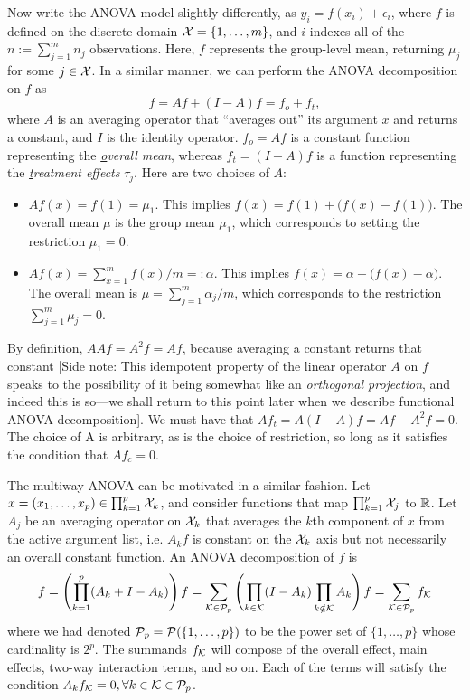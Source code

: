 
Now write the ANOVA model slightly differently, as $y_{i} = f(x_i) + \epsilon_{i}$, where $f$ is defined on the discrete domain ${\mathcal X} = \{1,\dots,m\}$, and $i$ indexes all of the $n := \sum_{j=1}^m n_j$ observations.
Here, $f$ represents the group-level mean, returning $\mu_j$ for some $j\in{\mathcal X}$.
In a similar manner, we can perform the ANOVA decomposition on $f$ as
\[
  f = Af + (I-A)f = f_o + f_t,
\]
where $A$ is an averaging operator that ``averages out'' its argument $x$ and returns a constant, and $I$ is the identity operator.
$f_o = Af$ is a constant function representing the \textit{\underline{o}verall mean}, whereas $f_t = (I - A)f$ is a function representing the \textit{\underline{t}reatment effects} $\tau_j$.
Here are two choices of $A$:
\begin{itemize}
  \item $Af(x) = f(1) = \mu_1$. This implies $f(x) = f(1) + \big(f(x) - f(1)\big)$. The overall mean $\mu$ is the group mean $\mu_1$, which corresponds to setting the restriction $\mu_1=0$.
  \item $Af(x) = \sum_{x=1}^m f(x) / m =: \bar \alpha$. This implies $f(x) = \bar \alpha + \big( f(x) - \bar \alpha \big)$. The overall mean is $\mu = \sum_{j=1}^m \alpha_j/m$, which corresponds to the restriction $\sum_{j=1}^m \mu_j = 0$.
\end{itemize}
By definition, $AAf = A^2f = Af$, because averaging a constant returns that constant
[Side note: This idempotent property of the linear operator $A$ on $f$ speaks to the possibility of it being somewhat like an \emph{orthogonal projection}, and indeed this is so---we shall return to this point later when we describe functional ANOVA decomposition].
We must have that $Af_t = A(I - A)f = Af - A^2f = 0$.
The choice of A is arbitrary, as is the choice of restriction, so long as it satisfies the condition that $Af_c = 0$.

The multiway ANOVA can be motivated in a similar fashion. 
Let $x = (x_1,\dots,x_p) \in \prod_{k=1}^p {\mathcal X}_k$, and consider functions that map $\prod_{k=1}^p {\mathcal X}_j$ to $\mathbb{R}$.
Let $A_j$ be an averaging operator on ${\mathcal X}_k$ that averages the $k$th component of $x$ from the active argument list, i.e. $A_kf$ is constant on the ${\mathcal X}_k$ axis but not necessarily an overall constant function.
An ANOVA decomposition of $f$ is
\[
  f = \left( \prod_{k=1}^p (A_k + I - A_k) \right)f = \sum_{{\mathcal K}\in{\mathcal P}_p} \left( \prod_{k\in{\mathcal K}} (I - A_k) \prod_{k\notin{\mathcal K}} A_k \right)f = \sum_{{\mathcal K}\in{\mathcal P}_p} f_{\mathcal K}
\]
where we had denoted ${\mathcal P}_p = {\mathcal P}(\{1,\dots,p\})$ to be the power set of $\{1,\dots,p\}$ whose cardinality is $2^p$.
The summands $f_{\mathcal K}$ will compose of the overall effect, main effects, two-way interaction terms, and so on.
Each of the terms will satisfy the condition $A_kf_{\mathcal K} = 0, \forall k \in {\mathcal K} \in {\mathcal P}_p$.


